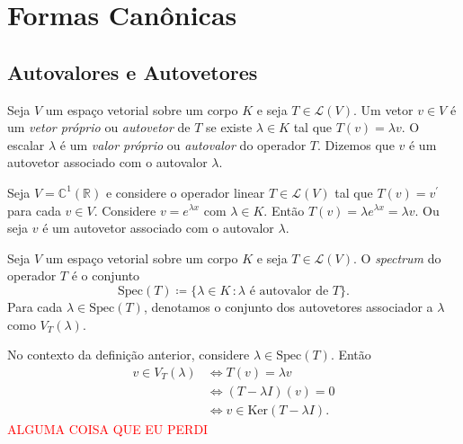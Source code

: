 \documentclass[11pt,twoside,a4paper]{book}
\begin{document}
\chapter{Formas Canônicas}
\section{Autovalores e Autovetores}
 \begin{definicao}
Seja \(V\) um espaço vetorial sobre um corpo \(K\) e seja \(T\in\mathcal{L}(V)\). Um vetor 
\(v\in V\) é um \emph{vetor próprio} ou \emph{autovetor} de \(T\) se existe \(\lambda\in K\) tal que \(T(v)=\lambda v\). O escalar \(\lambda\) é um \emph{valor próprio} ou \emph{autovalor} do operador \(T\). Dizemos que \(v\) é um autovetor associado com o autovalor \(\lambda\).
\end{definicao}
\begin{exemplo}
Seja \(V=\mathbb{C}^1(\mathbb{R})\) e considere o operador linear \(T\in\mathcal{L}(V)\) tal que \(T(v)=v^\prime\) para cada \(v\in V\). Considere \(v=e^{\lambda x}\) com \(\lambda\in K\). Então \(T(v)=\lambda e^{\lambda x}=\lambda v\). Ou seja \(v\) é um autovetor associado com o autovalor \(\lambda\).
\end{exemplo}
\begin{definicao}
Seja \(V\) um espaço vetorial sobre um corpo \(K\) e seja \(T\in\mathcal{L}(V)\). O \emph{spectrum} do operador \(T\) é o conjunto
\[\text{Spec}(T)\coloneqq\{\lambda\in K\,\colon \lambda \text{ é autovalor de } T\}.\]
Para cada \(\lambda\in\text{Spec}(T)\), denotamos o conjunto dos autovetores associador a \(\lambda\) como \(V_T(\lambda)\).
\end{definicao}
 No contexto da definição anterior, considere
 \(\lambda\in\text{Spec}(T)\). Então
 \begin{align*}
    v\in V_T(\lambda)&\iff T(v)=\lambda v\\&\iff (T-\lambda I)(v)=0\\&\iff v\in\text{Ker}(T-\lambda I).
 \end{align*}
\textcolor{red}{ALGUMA COISA QUE EU PERDI}
\end{document}
